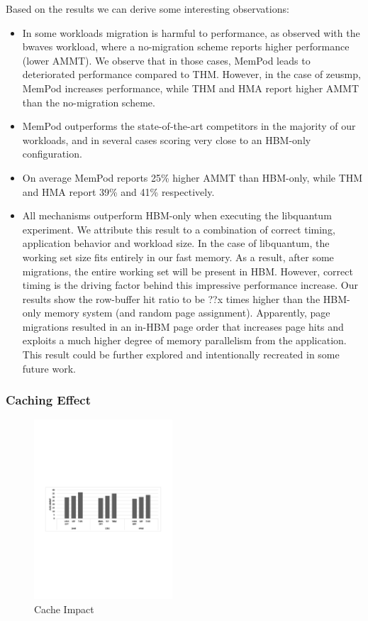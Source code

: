 Based on the results we can derive some interesting observations:
\begin{itemize}[leftmargin=0.4cm]
\setlength\itemsep{0em}
	\item In some workloads migration is harmful to performance, as observed with the bwaves workload, where a no-migration scheme reports higher performance (lower AMMT). We observe that in those cases, MemPod leads to deteriorated performance compared to THM. However, in the case of zeusmp, MemPod increases performance, while THM and HMA report higher AMMT than the no-migration scheme.
	\item MemPod outperforms the state-of-the-art competitors in the majority of our workloads, and in several cases scoring very close to an HBM-only configuration. 
	\item On average MemPod reports 25\% higher AMMT than HBM-only, while THM and HMA report 39\% and 41\% respectively.
	\item All mechanisms outperform HBM-only when executing the libquantum experiment. We attribute this result to a combination of correct timing, application behavior and workload size. In the case of libquantum, the working set size fits entirely in our fast memory. As a result, after some migrations, the entire working set will be present in HBM. However, correct timing is the driving factor behind this impressive performance increase. Our results show the row-buffer hit ratio to be ??x times higher than the HBM-only memory system (and random page assignment). Apparently, page migrations resulted in an in-HBM page order that increases page hits and exploits a much higher degree of memory parallelism from the application. This result could be further explored and intentionally recreated in some future work.
\end{itemize}

\subsubsection{Caching Effect}

\begin{figure}
  \includegraphics[width=0.46\textwidth]{figures/cache_impact.pdf}
  \caption{Cache Impact}
  \label{fig:cache}
\end{figure}

